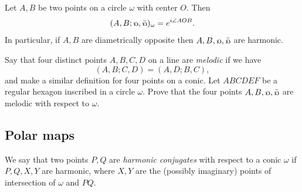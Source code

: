 \begin{cor} Let $A,B$ be two points on a circle $\omega$ with center $O$. Then
\[
(A,B;\fish,\bar\fish)_\omega = e^{i\angle AOB}.
\]
In particular, if $A,B$ are diametrically opposite then $A,B,\fish,\bar\fish$ are harmonic.
\end{cor}

\begin{exer}\label{melodic} Say that four distinct points $A,B,C,D$ on a line are \emph{melodic} if we have
\[
(A,B;C,D) = (A,D;B,C),
\]
and make a similar definition for four points on a conic. Let $ABCDEF$ be a regular hexagon inscribed in a circle $\omega$. Prove that the four points $A,B,\fish,\bar\fish$ are melodic with respect to $\omega$.
\end{exer}


\subsection{Polar maps}

\begin{defn} We say that two points $P,Q$ are \emph{harmonic conjugates} with respect to a conic $\omega$ if $P,Q,X,Y$ are harmonic, where $X,Y$ are the (possibly imaginary) points of intersection of $\omega$ and $PQ$.
\end{defn}

